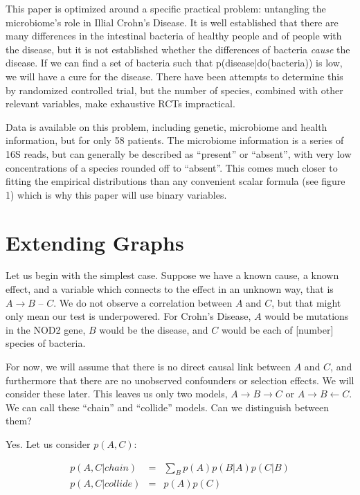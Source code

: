 \documentclass[twocolumn,12pt]{article}
\begin{document}
This paper is optimized around a specific practical problem:
untangling the microbiome's role in Illial Crohn's Disease.  It is
well established that there are many differences in the intestinal
bacteria of healthy people and of people with the disease, but it is
not established whether the differences of bacteria \textit{cause} the
disease.  If we can find a set of bacteria such that
p(disease|do(bacteria)) is low, we will have a cure for the disease.
There have been attempts to determine this by randomized controlled
trial, but the number of species, combined with other relevant
variables, make exhaustive RCTs impractical.

Data is available on this problem, including genetic, microbiome and
health information, but for only 58 patients.  The microbiome
information is a series of 16S reads, but can generally be described
as ``present'' or ``absent'', with very low concentrations of a
species rounded off to ``absent''.  This comes much closer to fitting
the empirical distributions than any convenient scalar formula (see
figure 1) which is why this paper will use binary variables.

\section{Extending Graphs}

Let us begin with the simplest case.  Suppose we have a known cause, a
known effect, and a variable which connects to the effect in an
unknown way, that is $A \rightarrow B$ -- $C$.  We do not observe a
correlation between $A$ and $C$, but that might only mean our test is
underpowered.  For Crohn's Disease, $A$ would be mutations in the NOD2
gene, $B$ would be the disease, and $C$ would be each of [number]
species of bacteria.

For now, we will assume that there is no direct causal
link between $A$ and $C$, and furthermore that there are no unobserved
confounders or selection effects.  We will consider these later.
This leaves us only two models, $A \rightarrow B \rightarrow C$ or $A
\rightarrow B \leftarrow C$.  We can call these ``chain'' and
``collide'' models.  Can we distinguish between them?

Yes.  Let us consider
$p(A,C)$:

\begin{eqnarray}
p(A,C|chain) & = & \sum_B p(A)p(B|A)p(C|B) \\
p(A,C|collide) & = & p(A)p(C)
\end{eqnarray}
\end{document}
